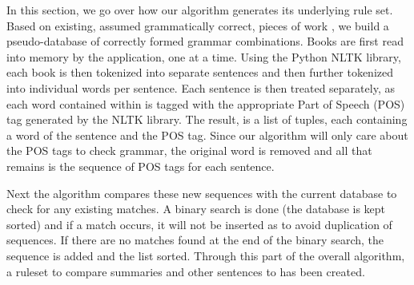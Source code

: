 \documentclass[11pt,a4paper]{article}
\begin{document}
\begin{multicols}{2}
In this section, we go over how our algorithm generates its underlying rule set. Based on existing, assumed grammatically correct, pieces of work \cite{gutenberg}, we build a pseudo-database of correctly formed grammar combinations. Books are first read into memory by the application, one at a time. Using the Python NLTK library, each book is then tokenized into separate sentences and then further tokenized into individual words per sentence. Each sentence is then treated separately, as each word contained within is tagged with the appropriate Part of Speech (POS) tag generated by the NLTK library. The result, is a list of tuples, each containing a word of the sentence and the POS tag. Since our algorithm will only care about the POS tags to check grammar, the original word is removed and all that remains is the sequence of POS tags for each sentence. 

Next the algorithm compares these new sequences with the current database to check for any existing matches. A binary search is done (the database is kept sorted) and if a match occurs, it will not be inserted as to avoid duplication of sequences. If there are no matches found at the end of the binary search, the sequence is added and the list sorted. Through this part of the overall algorithm, a ruleset to compare summaries and other sentences to has been created.


\end{multicols}
\end{document}
